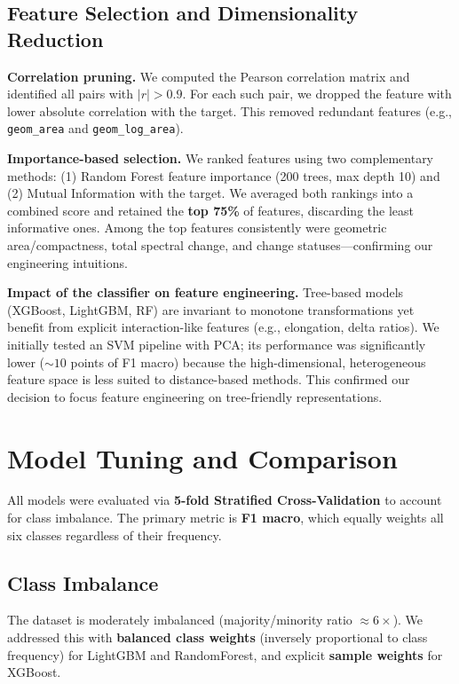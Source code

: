 \documentclass[11pt,a4paper]{article}
\begin{document}
\subsection{Feature Selection and Dimensionality Reduction}

\textbf{Correlation pruning.} We computed the Pearson correlation matrix and identified all pairs with $|r|>0.9$. For each such pair, we dropped the feature with lower absolute correlation with the target. This removed redundant features (e.g., \texttt{geom\_area} and \texttt{geom\_log\_area}).

\textbf{Importance-based selection.} We ranked features using two complementary methods: (1) Random Forest feature importance (200 trees, max depth 10) and (2) Mutual Information with the target. We averaged both rankings into a combined score and retained the \textbf{top 75\%} of features, discarding the least informative ones. Among the top features consistently were geometric area/compactness, total spectral change, and change statuses---confirming our engineering intuitions.

\textbf{Impact of the classifier on feature engineering.} Tree-based models (XGBoost, LightGBM, RF) are invariant to monotone transformations yet benefit from explicit interaction-like features (e.g., elongation, delta ratios). We initially tested an SVM pipeline with PCA; its performance was significantly lower (${\sim}10$ points of F1 macro) because the high-dimensional, heterogeneous feature space is less suited to distance-based methods. This confirmed our decision to focus feature engineering on tree-friendly representations.

\section{Model Tuning and Comparison}

All models were evaluated via \textbf{5-fold Stratified Cross-Validation} to account for class imbalance. The primary metric is \textbf{F1 macro}, which equally weights all six classes regardless of their frequency.

\subsection{Class Imbalance}
The dataset is moderately imbalanced (majority/minority ratio $\approx 6\times$). We addressed this with \textbf{balanced class weights} (inversely proportional to class frequency) for LightGBM and RandomForest, and explicit \textbf{sample weights} for XGBoost.
\end{document}
